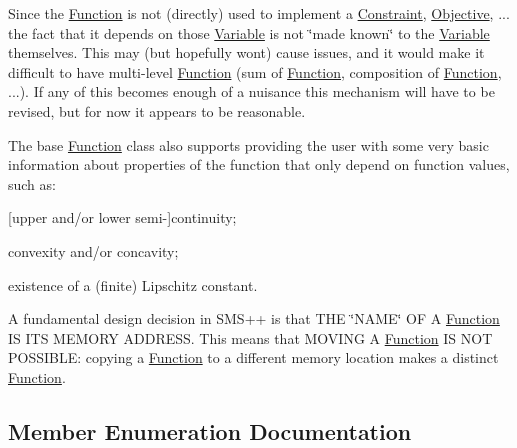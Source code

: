 Since the \mbox{\hyperlink{class_s_m_spp__di__unipi__it_1_1_function}{Function}} is not (directly) used to implement a \mbox{\hyperlink{class_s_m_spp__di__unipi__it_1_1_constraint}{Constraint}}, \mbox{\hyperlink{class_s_m_spp__di__unipi__it_1_1_objective}{Objective}}, ... the fact that it depends on those \mbox{\hyperlink{class_s_m_spp__di__unipi__it_1_1_variable}{Variable}} is not \char`\"{}made
known\char`\"{} to the \mbox{\hyperlink{class_s_m_spp__di__unipi__it_1_1_variable}{Variable}} themselves. This may (but hopefully won\textquotesingle{}t) cause issues, and it would make it difficult to have multi-\/level \mbox{\hyperlink{class_s_m_spp__di__unipi__it_1_1_function}{Function}} (sum of \mbox{\hyperlink{class_s_m_spp__di__unipi__it_1_1_function}{Function}}, composition of \mbox{\hyperlink{class_s_m_spp__di__unipi__it_1_1_function}{Function}}, ...). If any of this becomes enough of a nuisance this mechanism will have to be revised, but for now it appears to be reasonable.

The base \mbox{\hyperlink{class_s_m_spp__di__unipi__it_1_1_function}{Function}} class also supports providing the user with some very basic information about properties of the function that only depend on function values, such as\+:


\begin{DoxyItemize}
\item \mbox{[}upper and/or lower semi-\/\mbox{]}continuity;
\item convexity and/or concavity;
\item existence of a (finite) Lipschitz constant.
\end{DoxyItemize}

A fundamental design decision in S\+M\+S++ is that T\+HE \char`\"{}\+N\+A\+M\+E\char`\"{} OF A \mbox{\hyperlink{class_s_m_spp__di__unipi__it_1_1_function}{Function}} IS I\+TS M\+E\+M\+O\+RY A\+D\+D\+R\+E\+SS. This means that M\+O\+V\+I\+NG A \mbox{\hyperlink{class_s_m_spp__di__unipi__it_1_1_function}{Function}} IS N\+OT P\+O\+S\+S\+I\+B\+LE\+: copying a \mbox{\hyperlink{class_s_m_spp__di__unipi__it_1_1_function}{Function}} to a different memory location makes a distinct \mbox{\hyperlink{class_s_m_spp__di__unipi__it_1_1_function}{Function}}. 

\subsection{Member Enumeration Documentation}
\mbox{\label{class_s_m_spp__di__unipi__it_1_1_function_ad7177cbeb2113eb7a975acec14d13027}} 
